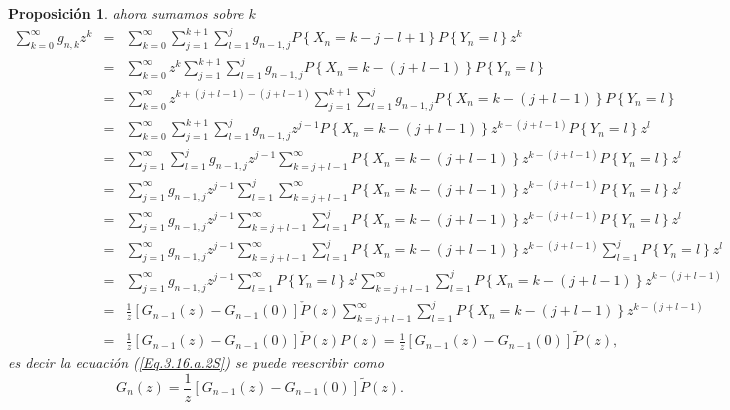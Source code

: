 \documentclass{article}
\newtheorem{Prop}{Proposición}[section]
\numberwithin{equation}{section}
\begin{document}
\begin{Prop}
ahora sumamos sobre $k$
\begin{eqnarray*}
\sum_{k=0}^{\infty}g_{n,k}z^{k}&=&\sum_{k=0}^{\infty}\sum_{j=1}^{k+1}\sum_{l=1}^{j}g_{n-1,j}P\left\{X_{n}=k-j-l+1\right\}P\left\{Y_{n}=l\right\}z^{k}\\
&=&\sum_{k=0}^{\infty}z^{k}\sum_{j=1}^{k+1}\sum_{l=1}^{j}g_{n-1,j}P\left\{X_{n}=k-\left(j+l-1\right)\right\}P\left\{Y_{n}=l\right\}\\
&=&\sum_{k=0}^{\infty}z^{k+\left(j+l-1\right)-\left(j+l-1\right)}\sum_{j=1}^{k+1}\sum_{l=1}^{j}g_{n-1,j}P\left\{X_{n}=k-\left(j+l-1\right)\right\}P\left\{Y_{n}=l\right\}\\
&=&\sum_{k=0}^{\infty}\sum_{j=1}^{k+1}\sum_{l=1}^{j}g_{n-1,j}z^{j-1}P\left\{X_{n}=k-\left(j+l-1\right)\right\}z^{k-\left(j+l-1\right)}P\left\{Y_{n}=l\right\}z^{l}\\
&=&\sum_{j=1}^{\infty}\sum_{l=1}^{j}g_{n-1,j}z^{j-1}\sum_{k=j+l-1}^{\infty}P\left\{X_{n}=k-\left(j+l-1\right)\right\}z^{k-\left(j+l-1\right)}P\left\{Y_{n}=l\right\}z^{l}\\
&=&\sum_{j=1}^{\infty}g_{n-1,j}z^{j-1}\sum_{l=1}^{j}\sum_{k=j+l-1}^{\infty}P\left\{X_{n}=k-\left(j+l-1\right)\right\}z^{k-\left(j+l-1\right)}P\left\{Y_{n}=l\right\}z^{l}\\
&=&\sum_{j=1}^{\infty}g_{n-1,j}z^{j-1}\sum_{k=j+l-1}^{\infty}\sum_{l=1}^{j}P\left\{X_{n}=k-\left(j+l-1\right)\right\}z^{k-\left(j+l-1\right)}P\left\{Y_{n}=l\right\}z^{l}\\
&=&\sum_{j=1}^{\infty}g_{n-1,j}z^{j-1}\sum_{k=j+l-1}^{\infty}\sum_{l=1}^{j}P\left\{X_{n}=k-\left(j+l-1\right)\right\}z^{k-\left(j+l-1\right)}\sum_{l=1}^{j}P\left\{Y_{n}=l\right\}z^{l}\\
&=&\sum_{j=1}^{\infty}g_{n-1,j}z^{j-1}\sum_{l=1}^{\infty}P\left\{Y_{n}=l\right\}z^{l}\sum_{k=j+l-1}^{\infty}\sum_{l=1}^{j}P\left\{X_{n}=k-\left(j+l-1\right)\right\}z^{k-\left(j+l-1\right)}\\
&=&\frac{1}{z}\left[G_{n-1}\left(z\right)-G_{n-1}\left(0\right)\right]\check{P}\left(z\right)\sum_{k=j+l-1}^{\infty}\sum_{l=1}^{j}P\left\{X_{n}=k-\left(j+l-1\right)\right\}z^{k-\left(j+l-1\right)}\\
&=&\frac{1}{z}\left[G_{n-1}\left(z\right)-G_{n-1}\left(0\right)\right]\check{P}\left(z\right)P\left(z\right)=\frac{1}{z}\left[G_{n-1}\left(z\right)-G_{n-1}\left(0\right)\right]\tilde{P}\left(z\right),
\end{eqnarray*}
es decir la ecuaci\'on (\ref{Eq.3.16.a.2S}) se puede reescribir como
\begin{equation}\label{Eq.3.16.a.2Sbis}
G_{n}\left(z\right)=\frac{1}{z}\left[G_{n-1}\left(z\right)-G_{n-1}\left(0\right)\right]\tilde{P}\left(z\right).
\end{equation}


\end{Prop}
\end{document}
